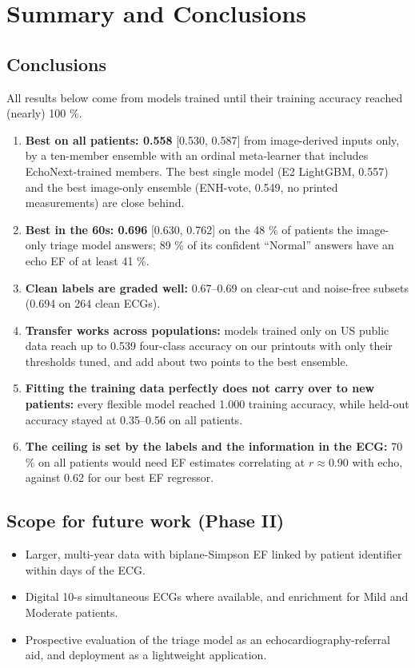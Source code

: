 \chapter{Summary and Conclusions}\label{ch:7}

\section{Conclusions}\label{sec:7.1}

All results below come from models trained until their training accuracy reached (nearly) 100 \%.

\begin{enumerate}
  \item \textbf{Best on all patients: 0.558} [0.530, 0.587] from image-derived inputs only, by a ten-member ensemble with an ordinal meta-learner that includes EchoNext-trained members. The best single model (E2 LightGBM, 0.557) and the best image-only ensemble (ENH-vote, 0.549, no printed measurements) are close behind.
  \item \textbf{Best in the 60s: 0.696} [0.630, 0.762] on the 48 \% of patients the image-only triage model answers; 89 \% of its confident ``Normal'' answers have an echo EF of at least 41 \%.
  \item \textbf{Clean labels are graded well:} 0.67--0.69 on clear-cut and noise-free subsets (0.694 on 264 clean ECGs).
  \item \textbf{Transfer works across populations:} models trained only on US public data reach up to 0.539 four-class accuracy on our printouts with only their thresholds tuned, and add about two points to the best ensemble.
  \item \textbf{Fitting the training data perfectly does not carry over to new patients:} every flexible model reached 1.000 training accuracy, while held-out accuracy stayed at 0.35--0.56 on all patients.
  \item \textbf{The ceiling is set by the labels and the information in the ECG:} 70 \% on all patients would need EF estimates correlating at $r\approx0.90$ with echo, against 0.62 for our best EF regressor.
\end{enumerate}
\section{Scope for future work (Phase II)}\label{sec:7.2}

\begin{itemize}
  \item Larger, multi-year data with biplane-Simpson EF linked by patient identifier within days of the ECG.
  \item Digital 10-s simultaneous ECGs where available, and enrichment for Mild and Moderate patients.
  \item Prospective evaluation of the triage model as an echocardiography-referral aid, and deployment as a lightweight application.
\end{itemize}
